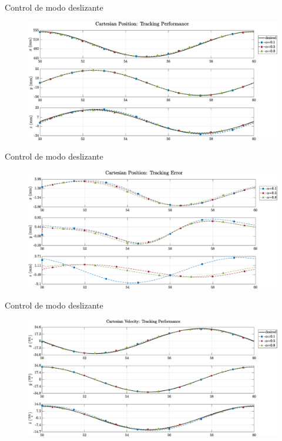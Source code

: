 \documentclass[10pt]{beamer} %
\begin{document}
	\begin{frame}[fragile]{Control de modo deslizante}
		\begin{figure}
			\centering
			\hspace*{-0.5cm}\includegraphics[width=1.1\textwidth]{img/SMCi/circular_traj/60_seg/articular_SMCi_pos_xyz_compare.eps}
		\end{figure}
	\end{frame}

	\begin{frame}[fragile]{Control de modo deslizante}
		\begin{figure}
			\centering
			\hspace*{-0.5cm}\includegraphics[width=1.1\textwidth]{img/SMCi/circular_traj/60_seg/articular_SMCi_pos_xyz_error_compare.eps}
		\end{figure}
	\end{frame}

	\begin{frame}[fragile]{Control de modo deslizante}
		\begin{figure}
			\centering
			\hspace*{-0.5cm}\includegraphics[width=1.1\textwidth]{img/SMCi/circular_traj/60_seg/articular_SMCi_vel_xyz_compare.eps}
		\end{figure}
	\end{frame}
	
\end{document}
